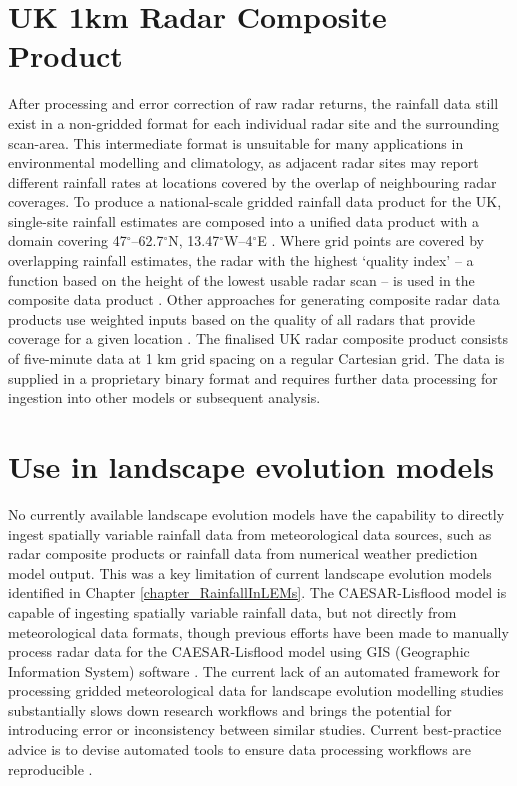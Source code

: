 \section{UK 1km Radar Composite Product}
After processing and error correction of raw radar returns, the rainfall data still exist in a non-gridded format for each individual radar site and the surrounding scan-area. This intermediate format is unsuitable for many applications in environmental modelling and climatology, as adjacent radar sites may report different rainfall rates at locations covered by the overlap of neighbouring radar coverages. To produce a national-scale gridded rainfall data product for the UK, single-site rainfall estimates are composed into a unified data product with a domain covering 47$^{\circ}$--62.7$^{\circ}$N, 13.47$^{\circ}$W--4$^{\circ}$E \citep{metoffice2003nimrod}. Where grid points are covered by overlapping rainfall estimates, the radar with the highest `quality index' -- a function based on the height of the lowest usable radar scan -- is used in the composite data product \citep{harrison2009high}. Other approaches for generating composite radar data products use weighted inputs based on the quality of all radars that provide coverage for a given location \citep{peura2007using}. The finalised UK radar composite product consists of five-minute data at 1 km grid spacing on a regular Cartesian grid. The data is supplied in a proprietary binary format and requires further data processing for ingestion into other models or subsequent analysis. %

\section{Use in landscape evolution models}
No currently available landscape evolution models have the capability to directly ingest spatially variable rainfall data from meteorological data sources, such as radar composite products or rainfall data from numerical weather prediction model output. This was a key limitation of current landscape evolution models identified in Chapter \ref{chapter_RainfallInLEMs}. The CAESAR-Lisflood model is capable of ingesting spatially variable rainfall data, but not directly from meteorological data formats, though previous efforts have been made to manually process radar data for the CAESAR-Lisflood model using GIS (Geographic Information System) software \citep[e.g.][]{coulthard2016sensitivity}. The current lack of an automated framework for processing gridded meteorological data for landscape evolution modelling studies substantially slows down research workflows and brings the potential for introducing error or inconsistency between similar studies. Current best-practice advice is to devise automated tools to ensure data processing workflows are reproducible \citep{wilson2014best}.

